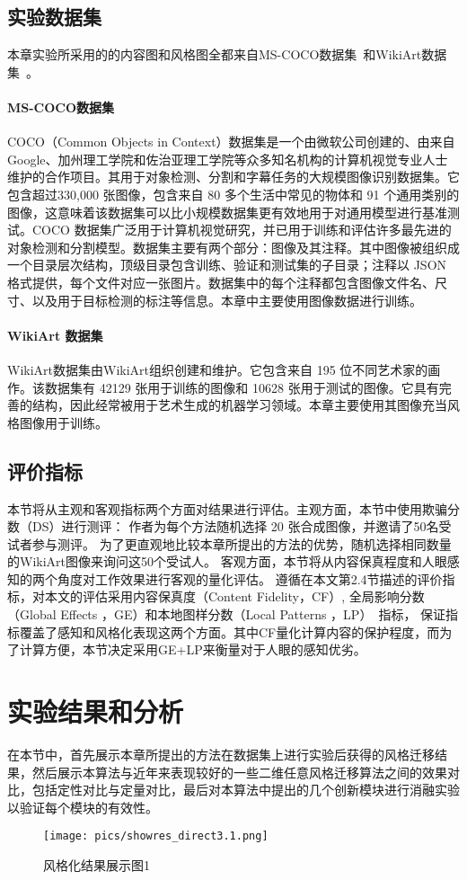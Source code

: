 \subsection{实验数据集}
本章实验所采用的的内容图和风格图全都来自MS-COCO数据集~\cite{lin2014microsoft}和WikiArt数据集~\cite{wikiart2018}。
\paragraph{MS-COCO数据集}
COCO（Common Objects in Context）数据集是一个由微软公司创建的、由来自 Google、加州理工学院和佐治亚理工学院等众多知名机构的计算机视觉专业人士维护的合作项目。其用于对象检测、分割和字幕任务的大规模图像识别数据集。它包含超过330,000 张图像，包含来自 80 多个生活中常见的物体和 91 个通用类别的图像，这意味着该数据集可以比小规模数据集更有效地用于对通用模型进行基准测试。COCO 数据集广泛用于计算机视觉研究，并已用于训练和评估许多最先进的对象检测和分割模型。数据集主要有两个部分：图像及其注释。其中图像被组织成一个目录层次结构，顶级目录包含训练、验证和测试集的子目录；注释以 JSON 格式提供，每个文件对应一张图片。数据集中的每个注释都包含图像文件名、尺寸、以及用于目标检测的标注等信息。本章中主要使用图像数据进行训练。
\paragraph{WikiArt 数据集}
WikiArt数据集由WikiArt组织创建和维护。它包含来自 195 位不同艺术家的画作。该数据集有 42129 张用于训练的图像和 10628 张用于测试的图像。它具有完善的结构，因此经常被用于艺术生成的机器学习领域。本章主要使用其图像充当风格图像用于训练。

\subsection{评价指标}
本节将从主观和客观指标两个方面对结果进行评估。主观方面，本节中使用欺骗分数（DS）进行测评：
作者为每个方法随机选择 20 张合成图像，并邀请了50名受试者参与测评。
为了更直观地比较本章所提出的方法的优势，随机选择相同数量的WikiArt图像来询问这50个受试人。
客观方面，本节将从内容保真程度和人眼感知的两个角度对工作效果进行客观的量化评估。
遵循在本文第2.4节描述的评价指标，对本文的评估采用内容保真度（Content Fidelity，CF）, 
全局影响分数（Global Effects ，GE）和本地图样分数（Local Patterns ，LP）~\cite{wang2021evaluate}指标，
保证指标覆盖了感知和风格化表现这两个方面。其中CF量化计算内容的保护程度，而为了计算方便，本节决定采用GE+LP来衡量对于人眼的感知优劣。

\section{实验结果和分析}
在本节中，首先展示本章所提出的方法在数据集上进行实验后获得的风格迁移结果，然后展示本算法与近年来表现较好的一些二维任意风格迁移算法之间的效果对比，包括定性对比与定量对比，最后对本算法中提出的几个创新模块进行消融实验以验证每个模块的有效性。
\begin{figure}[htbp]
    \centering
    \texttt{[image: pics/showres\_direct3.1.png]}
    \caption{\label{fig:pic_direct_show_3_1}风格化结果展示图1}
\end{figure}
